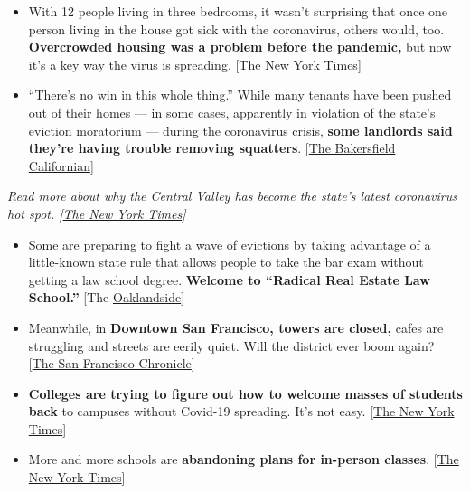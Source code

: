 \begin{itemize}
\item
  With 12 people living in three bedrooms, it wasn't surprising that
  once one person living in the house got sick with the coronavirus,
  others would, too. \textbf{Overcrowded housing was a problem before
  the pandemic,} but now it's a key way the virus is spreading.
  {[}\href{https://www.nytimes3xbfgragh.onion/2020/08/01/business/economy/housing-overcrowding-coronavirus.html?}{The
  New York Times}{]}
\item
  ``There's no win in this whole thing.'' While many tenants have been
  pushed out of their homes --- in some cases, apparently
  \href{https://calmatters.org/housing/2020/07/imperial-county-evictions-rules/}{in
  violation of the state's eviction moratorium} --- during the
  coronavirus crisis, \textbf{some landlords said they're having trouble
  removing squatters}.
  {[}\href{https://www.bakersfield.com/news/squatters-sit-out-evictions-moratorium/article_56f30548-d2d6-11ea-bccd-47329a9189c1.html}{The
  Bakersfield Californian}{]}
\end{itemize}

\emph{Read more about why the Central Valley has become the state's
latest coronavirus hot spot.
{[}}\href{https://www.nytimes3xbfgragh.onion/2020/07/28/us/newsom-coronavirus-valley.html}{\emph{The
New York Times}}\emph{{]}}

\begin{itemize}
\item
  Some are preparing to fight a wave of evictions by taking advantage of
  a little-known state rule that allows people to take the bar exam
  without getting a law school degree. \textbf{Welcome to ``Radical Real
  Estate Law School.''} {[}The
  \href{https://oaklandside.org/2020/07/30/oakland-radical-real-estate-law-school/}{Oaklandside}{]}
\item
  Meanwhile, in \textbf{Downtown San Francisco, towers are closed,}
  cafes are struggling and streets are eerily quiet. Will the district
  ever boom again?
  {[}\href{https://www.sfchronicle.com/business/article/Downtown-San-Francisco-coronavirus-pandemic-15450388.php}{The
  San Francisco Chronicle}{]}
\item
  \textbf{Colleges are trying to figure out how to welcome masses of
  students back} to campuses without Covid-19 spreading. It's not easy.
  {[}\href{https://www.nytimes3xbfgragh.onion/2020/08/02/us/covid-college-reopening.html?}{The
  New York Times}{]}
\item
  More and more schools are \textbf{abandoning plans for in-person
  classes}.
  {[}\href{https://www.nytimes3xbfgragh.onion/2020/08/01/us/schools-reopening-indiana-coronavirus.html?smtyp=cur\&smid=tw-nytimes}{The
  New York Times}{]}
\end{itemize}

